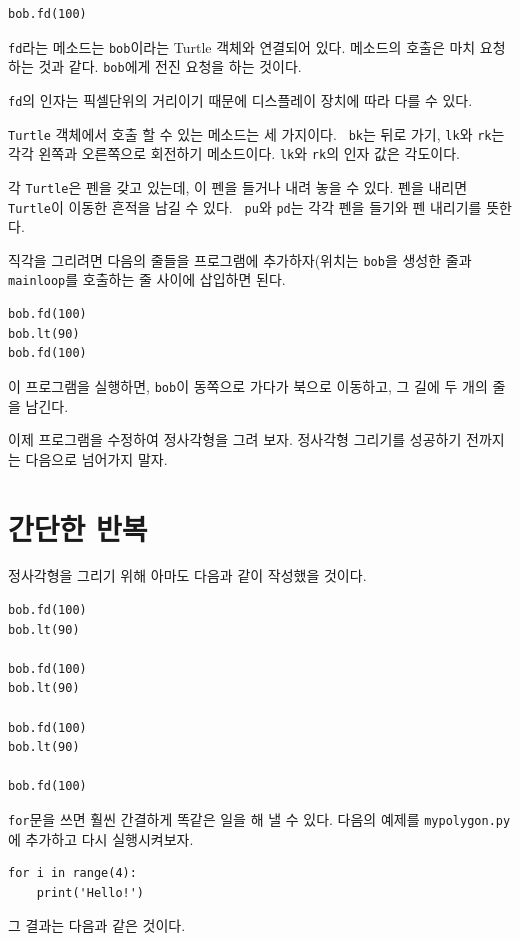 \documentclass[10pt]{book}
\begin{document}
\begin{verbatim}
bob.fd(100)
\end{verbatim}
%
{\tt fd}라는 메소드는 {\tt bob}이라는 Turtle 객체와 연결되어 있다.
메소드의 호출은 마치 요청하는 것과 같다. {\tt bob}에게 전진 요청을 하는
것이다.

{\tt fd}의 인자는 픽셀단위의 거리이기 때문에 디스플레이 장치에 따라 다를 수 있다. 

\texttt{Turtle} 객체에서 호출 할 수 있는 메소드는 세 가지이다.  {\tt
  bk}는 뒤로 가기, {\tt lk}와 {\tt rk}는 각각 왼쪽과 오른쪽으로
회전하기 메소드이다. {\tt lk}와 {\tt rk}의 인자 값은 각도이다.

각 \texttt{Turtle}은 펜을 갖고 있는데, 이 펜을 들거나 내려 놓을 수
있다.  펜을 내리면 \texttt{Turtle}이 이동한 흔적을 남길 수 있다.  {\tt
  pu}와 {\tt pd}는 각각 펜을 들기와 펜 내리기를 뜻한다.

직각을 그리려면 다음의 줄들을 프로그램에 추가하자(위치는 {\tt bob}을
생성한 줄과 \verb"mainloop"를 호출하는 줄 사이에 삽입하면 된다.

\begin{verbatim}
bob.fd(100)
bob.lt(90)
bob.fd(100)
\end{verbatim}
%
이 프로그램을 실행하면, {\tt bob}이 동쪽으로 가다가 북으로 이동하고, 그
길에 두 개의 줄을 남긴다.

이제 프로그램을 수정하여 정사각형을 그려 보자.  정사각형 그리기를
성공하기 전까지는 다음으로 넘어가지 말자.


\section{간단한 반복}
\label{repetition}

정사각형을 그리기 위해 아마도 다음과 같이 작성했을 것이다. 

\begin{verbatim}
bob.fd(100)
bob.lt(90)

bob.fd(100)
bob.lt(90)

bob.fd(100)
bob.lt(90)

bob.fd(100)
\end{verbatim}
%
{\tt for}문을 쓰면 훨씬 간결하게 똑같은 일을 해 낼 수 있다.  다음의
예제를 {\tt mypolygon.py}에 추가하고 다시 실행시켜보자.

\begin{verbatim}
for i in range(4):
    print('Hello!')
\end{verbatim}
%
그 결과는 다음과 같은 것이다.
\end{document}

